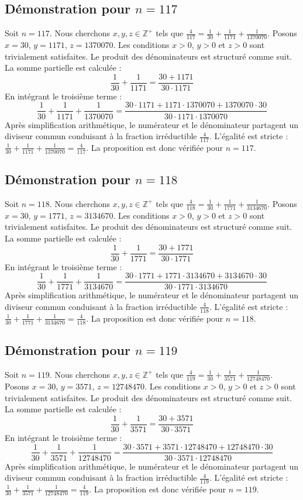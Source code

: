 \documentclass[11pt,a4paper]{article}
\begin{document}
\subsection{Démonstration pour $n = 117$}
Soit $n = 117$. Nous cherchons $x, y, z \in \mathbb{Z}^{+}$ tels que $\frac{4}{117} = \frac{1}{30} + \frac{1}{1171} + \frac{1}{1370070}$.
Posons $x = 30$, $y = 1171$, $z = 1370070$.
Les conditions $x > 0$, $y > 0$ et $z > 0$ sont trivialement satisfaites.
Le produit des dénominateurs est structuré comme suit. La somme partielle est calculée :
$$ \frac{1}{30} + \frac{1}{1171} = \frac{30+1171}{30 \cdot 1171} $$
En intégrant le troisième terme :
$$ \frac{1}{30} + \frac{1}{1171} + \frac{1}{1370070} = \frac{30 \cdot 1171 + 1171 \cdot 1370070 + 1370070 \cdot 30}{30 \cdot 1171 \cdot 1370070} $$
Après simplification arithmétique, le numérateur et le dénominateur partagent un diviseur commun conduisant à la fraction irréductible $\frac{4}{117}$.
L'égalité est stricte : $\frac{1}{30} + \frac{1}{1171} + \frac{1}{1370070} = \frac{4}{117}$.
La proposition est donc vérifiée pour $n = 117$.
\subsection{Démonstration pour $n = 118$}
Soit $n = 118$. Nous cherchons $x, y, z \in \mathbb{Z}^{+}$ tels que $\frac{4}{118} = \frac{1}{30} + \frac{1}{1771} + \frac{1}{3134670}$.
Posons $x = 30$, $y = 1771$, $z = 3134670$.
Les conditions $x > 0$, $y > 0$ et $z > 0$ sont trivialement satisfaites.
Le produit des dénominateurs est structuré comme suit. La somme partielle est calculée :
$$ \frac{1}{30} + \frac{1}{1771} = \frac{30+1771}{30 \cdot 1771} $$
En intégrant le troisième terme :
$$ \frac{1}{30} + \frac{1}{1771} + \frac{1}{3134670} = \frac{30 \cdot 1771 + 1771 \cdot 3134670 + 3134670 \cdot 30}{30 \cdot 1771 \cdot 3134670} $$
Après simplification arithmétique, le numérateur et le dénominateur partagent un diviseur commun conduisant à la fraction irréductible $\frac{4}{118}$.
L'égalité est stricte : $\frac{1}{30} + \frac{1}{1771} + \frac{1}{3134670} = \frac{4}{118}$.
La proposition est donc vérifiée pour $n = 118$.
\subsection{Démonstration pour $n = 119$}
Soit $n = 119$. Nous cherchons $x, y, z \in \mathbb{Z}^{+}$ tels que $\frac{4}{119} = \frac{1}{30} + \frac{1}{3571} + \frac{1}{12748470}$.
Posons $x = 30$, $y = 3571$, $z = 12748470$.
Les conditions $x > 0$, $y > 0$ et $z > 0$ sont trivialement satisfaites.
Le produit des dénominateurs est structuré comme suit. La somme partielle est calculée :
$$ \frac{1}{30} + \frac{1}{3571} = \frac{30+3571}{30 \cdot 3571} $$
En intégrant le troisième terme :
$$ \frac{1}{30} + \frac{1}{3571} + \frac{1}{12748470} = \frac{30 \cdot 3571 + 3571 \cdot 12748470 + 12748470 \cdot 30}{30 \cdot 3571 \cdot 12748470} $$
Après simplification arithmétique, le numérateur et le dénominateur partagent un diviseur commun conduisant à la fraction irréductible $\frac{4}{119}$.
L'égalité est stricte : $\frac{1}{30} + \frac{1}{3571} + \frac{1}{12748470} = \frac{4}{119}$.
La proposition est donc vérifiée pour $n = 119$.
\end{document}
